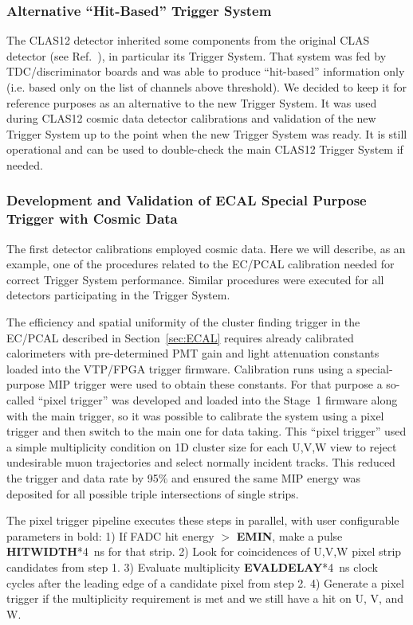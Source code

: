 \subsubsection{Alternative ``Hit-Based'' Trigger System}

The CLAS12 detector inherited some components from the original CLAS detector (see Ref.~\cite{clas-nim}),
in particular its Trigger System. That system was fed by TDC/discriminator boards and was able to produce
``hit-based'' information only (i.e. based only on the list of channels above threshold). We decided to keep it
for reference purposes as an alternative to the new Trigger System. It was used during CLAS12 cosmic data
detector calibrations and validation of the new Trigger System up to the point when the new Trigger System was
ready. It is still operational and can be used to double-check the main CLAS12 Trigger System if needed.

\subsubsection{Development and Validation of ECAL Special Purpose Trigger with Cosmic Data}

The first detector calibrations employed cosmic data. Here we will describe, as an example, one of the
procedures related to the EC/PCAL calibration needed for correct Trigger System performance. Similar
procedures were executed for all detectors participating in the Trigger System.

The efficiency and spatial uniformity of the cluster finding trigger in the EC/PCAL described in
Section~\ref{sec:ECAL} requires already calibrated calorimeters with pre-determined PMT gain and light
attenuation constants loaded into the VTP/FPGA trigger firmware.  Calibration runs using a special-purpose
MIP trigger were used to obtain these constants. For that purpose a so-called ``pixel trigger'' was developed
and loaded into the Stage~1 firmware along with the main trigger, so it was possible to calibrate the system
using a pixel trigger and then switch to the main one for data taking. This ``pixel trigger'' used a simple
multiplicity condition on 1D cluster size for each U,V,W view to reject undesirable muon trajectories and
select normally incident tracks.  This reduced the trigger and data rate by 95$\%$ and ensured the same
MIP energy was deposited for all possible triple intersections of single strips.

The pixel trigger pipeline executes these steps in parallel, with user configurable parameters in bold:
1) If FADC hit energy $>$ \textbf{EMIN}, make a pulse \textbf{HITWIDTH}*4~ns for that strip. 2) Look
for coincidences of U,V,W pixel strip candidates from step 1. 3) Evaluate multiplicity
\textbf{EVALDELAY}*4~ns clock cycles after the leading edge of a candidate pixel from step 2. 4) Generate
a pixel trigger if the multiplicity requirement is met and we still have a hit on U, V, and W. 

